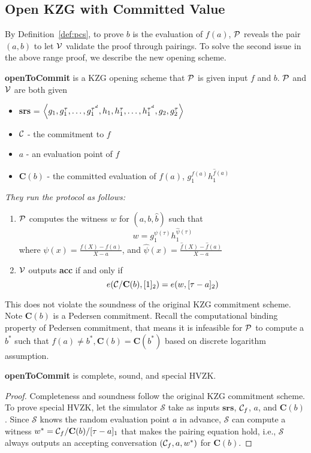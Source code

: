 \subsection{Open KZG with Committed Value}
\label{sec:kzgOpenComm}
By Definition~\ref{def:pcs}, to prove $b$ is the evaluation of $f(a)$, $\mathcal{P}$ reveals the pair $(a,b)$ to let $\mathcal{V}$ validate the proof through pairings. To solve the second issue in the above range proof, we describe the new opening scheme.
\begin{definition}
\textbf{openToCommit} is a KZG opening scheme that $\mathcal{P}$ is given input $f$ and $b$. $\mathcal{P}$ and $\mathcal{V}$ are both given
\begin{itemize}
    \item \textbf{srs} = $\left \langle g_1,g_1^\tau,\dots,g_1^{\tau^d},h_1,h_1^\tau,\dots,h_1^{\tau^d},g_2,g_2^\tau \right \rangle$
    \item $\mathcal{C}$ - the commitment to $f$
    \item $a$ - an evaluation point of $f$
    \item $\textbf{C}(b)$ - the committed evaluation of $f(a)$, $g_1^{f(a)}h_1^{\hat{f}(a)}$
\end{itemize}
\textit{They run the protocol as follows:}
\begin{enumerate}
    \item $\mathcal{P}$ computes the witness $w$ for $(a,b,\hat{b})$ such that
    \[ w=g_1^{\psi(\tau)}h_1^{\hat\psi(\tau)} \]
    where $\psi(x)=\frac{f(X)-f(a)}{X-a}$, and $\hat\psi(x)=\frac{\hat{f}(X)-\hat{f}(a)}{X-a}$
    \item $\mathcal{V}$ outputs \textbf{acc} if and only if
    \[ e(\mathcal{C}/\textbf{C}(b),[1]_2)=e(w,[\tau-a]_2) \]
\end{enumerate}
\end{definition}
This does not violate the soundness of the original KZG commitment scheme. Note $\textbf{C}(b)$ is a Pedersen commitment. Recall the computational binding property of Pedersen commitment, that means it is infeasible for $\mathcal{P}$ to compute a $b^*$ such that $f(a)\ne{b^*},\textbf{C}(b)=\textbf{C}(b^*)$ based on discrete logarithm assumption.
\begin{theorem}
\label{thm:kzgOpen}
\textbf{openToCommit} is complete, sound, and special HVZK.
\end{theorem}
\begin{proof}
Completeness and soundness follow the original KZG commitment scheme. \\
To prove special HVZK, let the simulator $\mathcal{S}$ take as inputs $\textbf{srs}$, $\mathcal{C}_f$, $a$, and $\textbf{C}(b)$. Since $\mathcal{S}$ knows the random evaluation point $a$ in advance, $\mathcal{S}$ can compute a witness $w^*=\mathcal{C}_f/\textbf{C}(b)/[\tau-a]_1$ that makes the pairing equation hold, i.e., $\mathcal{S}$ always outputs an accepting conversation $(\mathcal{C}_f,a,w^*)$ for $\textbf{C}(b)$.
\end{proof}
